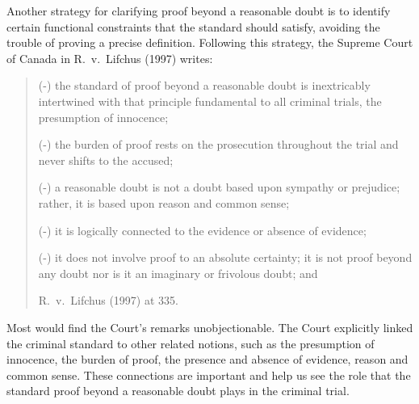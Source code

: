 \documentclass[10pt]{article}
\begin{document}
Another strategy for clarifying proof beyond a reasonable doubt is to identify 
certain functional constraints that the standard should satisfy, avoiding the trouble 
of proving a precise definition. Following this strategy, the Supreme Court of Canada in R.\ v.\ Lifchus (1997) 
writes:

\begin{quote}
(-) the standard of proof beyond a reasonable 
doubt is inextricably intertwined with that  
principle fundamental to all criminal trials, 
the presumption of innocence;

(-) the burden of proof rests on the prosecution 
throughout the trial and never shifts to the
accused; 

(-) a reasonable doubt is not a doubt based upon 
sympathy or prejudice; 
rather, it is based upon reason and common sense;

(-) it is logically connected to the evidence or  
absence of evidence; 
 
(-) it does not involve proof to an absolute certainty; it is not proof beyond any doubt nor is 
it an imaginary or frivolous doubt;  and

R.\ v.\ Lifchus (1997) at 335.
\end{quote}

\noindent
Most would find the Court's remarks unobjectionable. The  Court 
explicitly linked the criminal standard to other related notions, such as the presumption of innocence, the burden of proof, the presence and absence of evidence, 
reason and common sense. These connections are important and help us see the role that the standard proof beyond 
a reasonable doubt plays in the criminal trial. 
\end{document}
